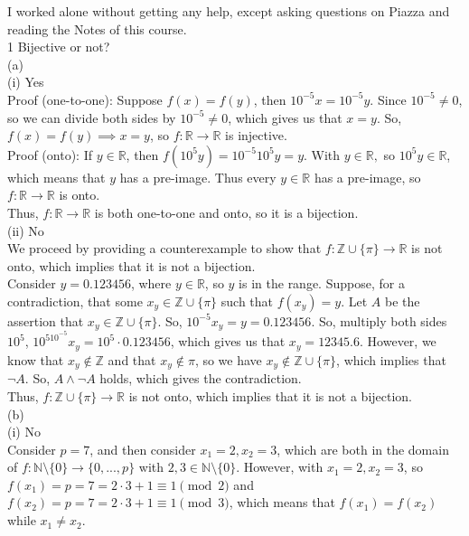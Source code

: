 \documentclass{article}
\begin{document}
I worked alone without getting any help, except asking questions on Piazza and reading the Notes of this course. \\[1cm]
{\Large 1 Bijective or not?} \\[.5cm]
(a) \\[.1cm]
(i) {\color{red} Yes} \\[.2cm]
\indent Proof (one-to-one): Suppose $f(x) = f(y)$, then $10^{-5}x = 10^{-5}y$. Since $10^{-5}\neq0$, so we can divide both sides by $10^{-5}\neq0$, which gives us that $x = y$. So, $f(x) = f(y)\implies x = y$, so $f:\mathbb{R}\rightarrow\mathbb{R}$ is injective. \\[.1cm]
\indent Proof (onto): If $y\in\mathbb{R}$, then $f(10^5y) = 10^{-5}10^5y = y$. With $y\in\mathbb{R},$ so $10^5y\in\mathbb{R}$, which means that $y$ has a pre-image. Thus every $y\in\mathbb{R}$ has a pre-image, so $f:\mathbb{R}\rightarrow\mathbb{R}$ is onto. \\[.1cm]
\indent Thus, $f:\mathbb{R}\rightarrow\mathbb{R}$ is both one-to-one and onto, so it is a bijection. \\[.3cm]
(ii) {\color{red} No} \\[.2cm]
\indent We proceed by providing a counterexample to show that $f:\mathbb{Z}\cup\{\pi\}\rightarrow\mathbb{R}$ is not onto, which implies that it is not a bijection. \\[.1cm]
\indent Consider $y = 0.123456$, where $y\in\mathbb{R}$, so $y$ is in the range. Suppose, for a contradiction, that some $x_y\in\mathbb{Z}\cup\{\pi\}$ such that $f(x_y) = y$. Let $A$ be the assertion that $x_y\in\mathbb{Z}\cup\{\pi\}$.
So, $10^{-5}x_y = y = 0.123456$. So, multiply both sides $10^5$, $10^510^{-5}x_y = 10^5\cdot0.123456$, which gives us that $x_y = 12345.6$. However, we know that $x_y\not\in\mathbb{Z}$ and that $x_y\not\in\pi$, so we have $x_y\not\in\mathbb{Z}\cup\{\pi\}$, which implies that $\neg A$. So, $A\land\neg A$ holds, which gives the contradiction. \\[.1cm]
\indent Thus, $f:\mathbb{Z}\cup\{\pi\}\rightarrow\mathbb{R}$ is not onto, which implies that it is not a bijection. \\[.5cm]
(b) \\[.1cm]
(i) {\color{red} No} \\[.2cm]
\indent Consider $p = 7$, and then consider $x_1 = 2, x_2 = 3$, which are both in the domain of $f:\mathbb{N}\setminus\{0\}\rightarrow\{0,...,p\}$ with $2,3\in\mathbb{N}\setminus\{0\}$. However, with $x_1 = 2, x_2 = 3$, so $f(x_1) = p = 7 = 2\cdot3+1\equiv1\pmod{2}$ and $f(x_2) = p = 7 = 2\cdot3+1\equiv1\pmod{3}$, which means that $f(x_1) = f(x_2)$ while $x_1\neq x_2.$ \\[.1cm]
\end{document}
